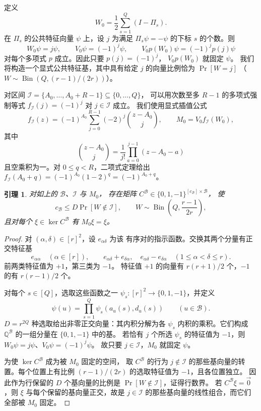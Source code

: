 \documentclass[11pt,reqno]{amsart}
\numberwithin{equation}{section}
\newtheorem{lemma}[theorem]{引理}
\theoremstyle{definition}\newtheorem{definition}[theorem]{定义}
\theoremstyle{remark}\newtheorem{remark}[theorem]{注}
\renewcommand{\le}{\leqslant}
\begin{document}
定义
\begin{equation}\label{eq:swap-weight}
 W_0=\frac12\sum_{s=1}^Q(I-\Pi_s).
\end{equation}
在 $\Pi_s$ 的公共特征向量 $\psi$ 上，设 $j$ 为满足
$\Pi_s\psi=-\psi$ 的下标 $s$ 的个数。则
\[
 W_0\psi=j\psi,\qquad V_0\psi=(-1)^j\psi,
 \qquad V_0p(W_0)\psi=(-1)^jp(j)\psi
\]
对每个多项式 $p$ 成立。因此只要 $p(j)=(-1)^j$，
$V_0p(W_0)$ 就固定 $\psi$。
我们将构造一个显式公共特征基，其中具有给定 $j$
的向量比例恰为 $\Pr[W=j]$
（$W\sim\operatorname{Bin}(Q,(r-1)/(2r))$）。

对区间
$\mathcal I=\{A_0,\ldots,A_0+R-1\}\subseteq\{0,\ldots,Q\}$，
可以用次数至多 $R-1$ 的多项式强制等式
$f_{\mathcal I}(j)=(-1)^j$ 对 $j\in\mathcal I$ 成立。
我们使用显式插值公式
\begin{equation}\label{eq:swap-matrix-definition}
 f_{\mathcal I}(z)=(-1)^{A_0}\sum_{j=0}^{R-1}(-2)^j
                         \binom{z-A_0}{j},
 \qquad M_0=V_0f_{\mathcal I}(W_0),
\end{equation}
其中
\[
 \binom{z-A_0}{j}=\frac1{j!}\prod_{a=0}^{j-1}(z-A_0-a)
\]
且空乘积为一。对 $0\le q<R$，二项式定理给出
$f_{\mathcal I}(A_0+q)=(-1)^{A_0}(1-2)^q=(-1)^{A_0+q}$。

\begin{lemma}\label{lem:swaps-matrix}
对如上的 $\mathcal B$、$\mathcal I$ 与 $M_0$，
存在矩阵 $C^{\mathcal B}\in\{0,1,-1\}^{[c_{\mathcal B}]\times\mathcal B}$，
使
\[
 c_{\mathcal B}\le D\Pr[W\notin\mathcal I],\qquad
 W\sim\operatorname{Bin}\!\left(Q,\frac{r-1}{2r}\right),
\]
且对每个 $\xi\in\ker C^{\mathcal B}$ 有
$M_0\xi=\xi$。
\end{lemma}
\begin{proof}
对 $(\alpha,\delta)\in[r]^2$，设 $e_{\alpha\delta}$ 为该
有序对的指示函数。交换其两个分量有正交特征基
\[
 e_{\alpha\alpha}\quad(\alpha\in[r]),\qquad
 e_{\alpha\delta}+e_{\delta\alpha},\quad
 e_{\alpha\delta}-e_{\delta\alpha}\quad(1\le\alpha<\delta\le r).
\]
前两类特征值为 $+1$，第三类为 $-1$。
特征值 $+1$ 的向量有 $r(r+1)/2$ 个，$-1$ 的有
$r(r-1)/2$ 个。

对每个 $s\in[Q]$，选取这些函数之一
$\psi_s:[r]^2\to\{0,1,-1\}$，并定义
\[
 \psi(u)=\prod_{s=1}^Q\psi_s(a_u(s),d_u(s))
 \qquad(u\in\mathcal B).
\]
$D=r^{2Q}$ 种选取给出非零正交向量：其内积分解为各
$\psi_s$ 内积的乘积。它们构成 $\mathbb Q^{\mathcal B}$
的一组分量在 $\{0,1,-1\}$ 中的基。
若恰有 $j$ 个所选 $\psi_s$ 的特征值为 $-1$，则
$W_0\psi=j\psi$、$V_0\psi=(-1)^j\psi$。
故只要 $j\in\mathcal I$，$M_0$ 就固定 $\psi$。

为使 $\ker C^{\mathcal B}$ 成为被 $M_0$ 固定的空间，
取 $C^{\mathcal B}$ 的行为 $j\notin\mathcal I$
的那些基向量的转置。每个位置上有比例 $(r-1)/(2r)$
的选取特征值为 $-1$，且各位置独立。
因此作为行保留的 $D$ 个基向量的比例是
$\Pr[W\notin\mathcal I]$，证得行数界。
若 $C^{\mathcal B}\xi=\vec{0}$，则 $\xi$
与每个保留的基向量正交，故是 $j\in\mathcal I$
的那些基向量的线性组合，而它们全部被 $M_0$ 固定。
\end{proof}
\end{document}
